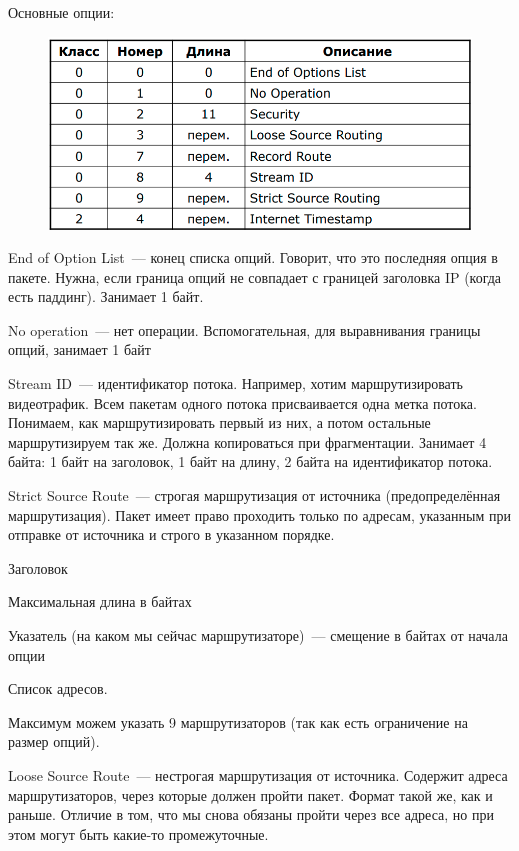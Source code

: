 Основные опции:

\begin{figure}[H]
  \centering
  \includegraphics[width=15cm]{images/02/05}
\end{figure}
\begin{MyItemize}
    \item End of Option List~--- конец списка опций. Говорит, что это последняя опция в пакете. Нужна, если граница опций не совпадает с границей заголовка IP (когда есть паддинг). Занимает 1 байт.
    \item No operation~--- нет операции. Вспомогательная, для выравнивания границы опций, занимает 1 байт
    \item Stream ID~--- идентификатор потока. Например, хотим маршрутизировать видеотрафик. Всем пакетам одного потока присваивается одна метка потока. Понимаем, как маршрутизировать первый из них, а потом остальные маршрутизируем так же. Должна копироваться при фрагментации. Занимает 4 байта: 1 байт на заголовок, 1 байт на длину, 2 байта на идентификатор потока.
    \item Strict Source Route~--- строгая маршрутизация от источника (предопределённая маршрутизация). Пакет имеет право проходить только по адресам, указанным при отправке от источника и строго в указанном порядке.
    \begin{MyItemize}
        \item Заголовок
        \item Максимальная длина в байтах
        \item Указатель (на каком мы сейчас маршрутизаторе)~--- смещение в байтах от начала опции
        \item Список адресов.
    \end{MyItemize}
    Максимум можем указать 9 маршрутизаторов (так как есть ограничение на размер опций).
    \item Loose Source Route~--- нестрогая маршрутизация от источника. Содержит адреса маршрутизаторов, через которые должен пройти пакет. Формат такой же, как и раньше. Отличие в том, что мы снова обязаны пройти через все адреса, но при этом могут быть какие-то промежуточные.


\end{MyItemize}
